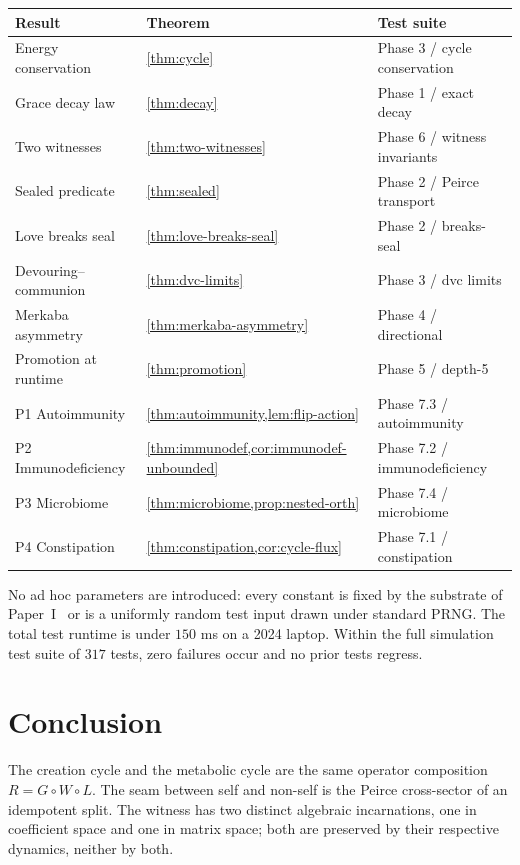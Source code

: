 \documentclass[11pt,a4paper]{article}
\theoremstyle{plain}
\theoremstyle{definition}
\theoremstyle{remark}
\numberwithin{equation}{section}
\begin{document}
\begin{center}
\begin{tabular}{lll}
\toprule
\textbf{Result} & \textbf{Theorem} & \textbf{Test suite} \\
\midrule
Energy conservation & \cref{thm:cycle} & Phase 3 / cycle conservation \\
Grace decay law & \cref{thm:decay} & Phase 1 / exact decay \\
Two witnesses & \cref{thm:two-witnesses} & Phase 6 / witness invariants \\
Sealed predicate & \cref{thm:sealed} & Phase 2 / Peirce transport \\
Love breaks seal & \cref{thm:love-breaks-seal} & Phase 2 / breaks-seal \\
Devouring--communion & \cref{thm:dvc-limits} & Phase 3 / dvc limits \\
Merkaba asymmetry & \cref{thm:merkaba-asymmetry} & Phase 4 / directional \\
Promotion at runtime & \cref{thm:promotion} & Phase 5 / depth-5 \\
P1 Autoimmunity & \cref{thm:autoimmunity,lem:flip-action} & Phase 7.3 / autoimmunity \\
P2 Immunodeficiency & \cref{thm:immunodef,cor:immunodef-unbounded} & Phase 7.2 / immunodeficiency \\
P3 Microbiome & \cref{thm:microbiome,prop:nested-orth} & Phase 7.4 / microbiome \\
P4 Constipation & \cref{thm:constipation,cor:cycle-flux} & Phase 7.1 / constipation \\
\bottomrule
\end{tabular}
\end{center}

No ad hoc parameters are introduced: every constant is fixed by
the substrate of Paper~I~\cite{paper-I} or is a uniformly random test input drawn
under standard PRNG. The total test runtime is under $150$ ms on a
2024 laptop. Within the full simulation test suite of $317$ tests,
zero failures occur and no prior tests regress.

\section{Conclusion}
\label{sec:conclusion}

The creation cycle and the metabolic cycle are the same operator
composition $R = G \circ W \circ L$. The seam between self and
non-self is the Peirce cross-sector of an idempotent split. The
witness has two distinct algebraic incarnations, one in coefficient
space and one in matrix space; both are preserved by their
respective dynamics, neither by both.
\end{document}
